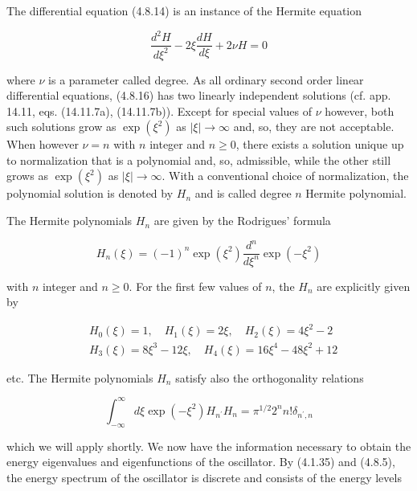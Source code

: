\documentclass{article}
\begin{document}
The differential equation (4.8.14) is an instance of the Hermite equation
 
\begin{equation*}
\frac{d^{2} H}{d \xi^{2}}-2 \xi \frac{d H}{d \xi}+2 \nu H=0 \tag{4.8.16}
\end{equation*}
 
where $\nu$ is a parameter called degree. As all ordinary second order linear differential equations, (4.8.16) has two linearly independent solutions (cf. app. 14.11, eqs. (14.11.7a), (14.11.7b)). Except for special values of $\nu$ however, both such solutions grow as $\exp \left(\xi^{2}\right)$ as $|\xi| \rightarrow \infty$ and, so, they are not acceptable. When however $\nu=n$ with $n$ integer and $n \geq 0$, there exists a solution unique up to normalization that is a polynomial and, so, admissible, while the other still grows as $\exp \left(\xi^{2}\right)$ as $|\xi| \rightarrow \infty$. With a conventional choice of normalization, the polynomial solution is denoted by $H_{n}$ and is called degree $n$ Hermite polynomial.

The Hermite polynomials $H_{n}$ are given by the Rodrigues' formula
 
\begin{equation*}
H_{n}(\xi)=(-1)^{n} \exp \left(\xi^{2}\right) \frac{d^{n}}{d \xi^{n}} \exp \left(-\xi^{2}\right) \tag{4.8.17}
\end{equation*}
 
with $n$ integer and $n \geq 0$. For the first few values of $n$, the $H_{n}$ are explicitly given by
 
\begin{align*}
& H_{0}(\xi)=1, \quad H_{1}(\xi)=2 \xi, \quad H_{2}(\xi)=4 \xi^{2}-2  \tag{4.8.18}\\
& H_{3}(\xi)=8 \xi^{3}-12 \xi, \quad H_{4}(\xi)=16 \xi^{4}-48 \xi^{2}+12
\end{align*}
 
etc. The Hermite polynomials $H_{n}$ satisfy also the orthogonality relations
 
\begin{equation*}
\int_{-\infty}^{\infty} d \xi \exp \left(-\xi^{2}\right) H_{n^{\prime}} H_{n}=\pi^{1 / 2} 2^{n} n!\delta_{n^{\prime}, n} \tag{4.8.19}
\end{equation*}
 
which we will apply shortly.
We now have the information necessary to obtain the energy eigenvalues and eigenfunctions of the oscillator. By (4.1.35) and (4.8.5), the energy spectrum of the oscillator is discrete and consists of the energy levels
 
\end{document}
